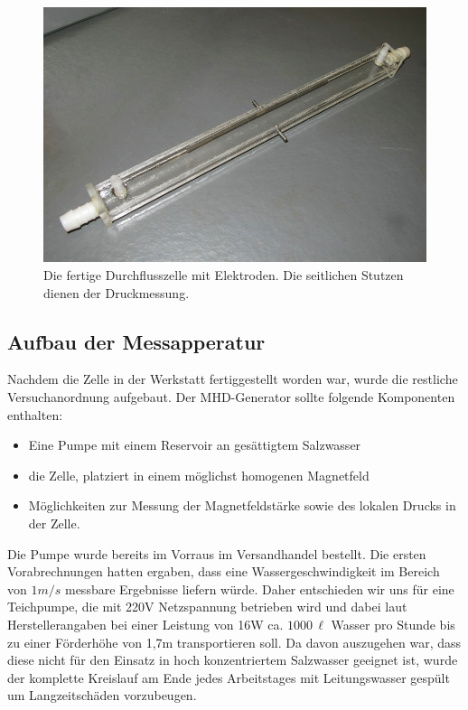 \documentclass[11pt]{scrartcl}
\newcommand{\unit}[1]{\ensuremath{\,\mathrm{#1}}} %
\begin{document}
\begin{figure}[ht]
\begin{center}
\includegraphics[width=1.0\textwidth]{images/zelle-einzeln.jpg}
\end{center}
\vspace{-1.5\baselineskip}
\caption{Die fertige Durchflusszelle mit Elektroden. Die seitlichen Stutzen dienen der Druckmessung.}
\label{zelle-einzeln}
\end{figure}

\subsection{Aufbau der Messapperatur}		%
Nachdem die Zelle in der Werkstatt fertiggestellt worden war, wurde die restliche Versuchanordnung aufgebaut. Der MHD-Generator sollte folgende Komponenten enthalten:

\begin{itemize}
	\item Eine Pumpe mit einem Reservoir an ges\"attigtem Salzwasser 
	\item die Zelle, platziert in einem m\"oglichst homogenen Magnetfeld 	
	\item M\"oglichkeiten zur Messung der Magnetfeldst\"arke sowie des lokalen Drucks in der Zelle.
\end{itemize}

Die Pumpe wurde bereits im Vorraus im Versandhandel bestellt. Die ersten Vorabrechnungen hatten ergaben, dass eine Wassergeschwindigkeit im Bereich von $1m/s$ messbare Ergebnisse liefern w\"urde. Daher entschieden wir uns f\"ur eine Teichpumpe, die mit 220V Netzspannung betrieben wird und dabei laut Herstellerangaben bei einer Leistung von 16W ca. $1000\unit{\ell}$ Wasser pro Stunde bis zu einer F\"orderh\"ohe von 1,7m transportieren soll. Da davon auszugehen war, dass diese nicht f\"ur den Einsatz in hoch konzentriertem Salzwasser geeignet ist, wurde der komplette Kreislauf am Ende jedes Arbeitstages mit Leitungswasser gesp\"ult um Langzeitsch\"aden vorzubeugen.
\end{document}
